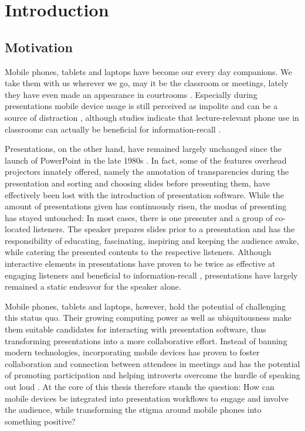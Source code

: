 \chapter{Introduction}
\label{cha:introduction}

\section{Motivation}

Mobile phones, tablets and laptops have become our every day companions. We take them with us wherever we go, may it be the classroom or meetings, lately they have even made an appearance in courtrooms \cite{Farrell:TrialByTablet}. Especially during presentations mobile device usage is still perceived as impolite and can be a source of distraction \cite{Bohmer:SmartphoneUseRude, Bajko:ComparativePerceptionSmartphoneMeeting, Kuznekoff:ImpactPhoneStudentLearning}, although studies indicate that lecture-relevant phone use in classrooms can actually be beneficial for information-recall \cite{Kuznekoff:MobilePhoneClassroomTwitter}.

Presentations, on the other hand, have remained largely unchanged since the launch of PowerPoint in the late 1980s \cite{Yates:PowerPoint}. In fact, some of the features overhead projectors innately offered, namely the annotation of transparencies during the presentation and sorting and choosing slides before presenting them, have effectively been lost with the introduction of presentation software. While the amount of presentations given has continuously risen, the modus of presenting has stayed untouched: In most cases, there is one presenter and a group of co-located listeners. The speaker prepares slides prior to a presentation and has the responsibility of educating, fascinating, inspiring and keeping the audience awake, while catering the presented contents to the respective listeners. Although interactive elements in presentations have proven to be twice as effective at engaging listeners and beneficial to information-recall \cite{prezi-science}, presentations have largely remained a static endeavor for the speaker alone.

Mobile phones, tablets and laptops, however, hold the potential of challenging this status quo. Their growing computing power as well as ubiquitousness make them suitable candidates for interacting with presentation software, thus transforming presentations into a more collaborative effort. Instead of banning modern technologies, incorporating mobile devices has proven to foster collaboration and connection between attendees in meetings \cite{Bohmer:SmartphoneUseRude} and has the potential of promoting participation and helping introverts overcome the hurdle of speaking out loud \cite{Bry:Backstage}. At the core of this thesis therefore stands the question: How can mobile devices be integrated into presentation workflows to engage and involve the audience, while transforming the stigma around mobile phones into something positive?

